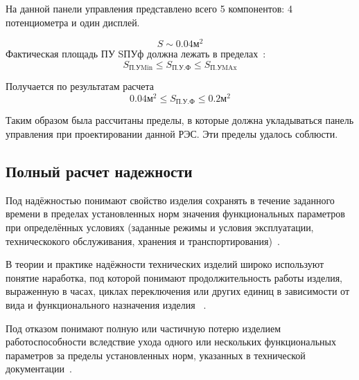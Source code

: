 На данной панели управления представлено всего 5 компонентов:
4 потенциометра и один дисплей.

$$S \sim 0.04 \textrm{м}^2$$
Фактическая площадь ПУ SПУф должна лежать в пределах~\cite{Alipherenko2007}:
\begin{equation}
  S_{\textrm{П.УMin}} \leq S_{\textrm{П.У.Ф}} \leq S_{\textrm{П.УMAx}}
\end{equation}

Получается по результатам расчета
$$  0.04 \textrm{м}^2 \leq S_{\textrm{П.У.Ф}} \leq 0.2 \textrm{м}^2$$

Таким образом была рассчитаны пределы, в которые должна укладываться
панель управления при проектировании данной РЭС.
Эти пределы удалось соблюсти.

\subsection{Полный расчет надежности}

Под надёжностью понимают свойство изделия сохранять в течение
заданного времени в пределах установленных норм значения
функциональных параметров при определённых условиях (заданные режимы и
условия эксплуатации, техническокого обслуживания, хранения и
транспортирования)~\cite{Borovikov2010}.

В теории и практике надёжности технических изделий широко используют
понятие наработка, под которой понимают продолжительность работы
изделия, выраженную в часах, циклах переключения или других единиц в
зависимости от вида и функционального назначения изделия ~\cite{Borovikov2010}.

Под отказом понимают полную или частичную потерю изделием
работоспособности вследствие ухода одного или нескольких
функциональных параметров за пределы установленных норм, указанных в
технической документации~\cite{Borovikov2010}.

